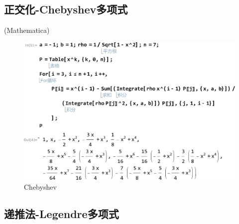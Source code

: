 \subsection{正交化-Chebyshev多项式}

\qa (Mathematica)
\begin{figure}[H]
	\centering
	\includegraphics[width = 0.8\linewidth]{day6/fig2.png}
	\caption{Chebyshev}
\end{figure}
\subsection{递推法-Legendre多项式}

